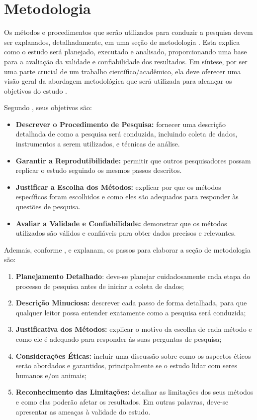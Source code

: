 \section{Metodologia}\label{sec:metodologia}

Os métodos e procedimentos que serão utilizados para conduzir a pesquisa devem ser explanados, detalhadamente, em uma seção de metodologia \cite{Wazlawick2021}. Esta explica como o estudo será planejado, executado e analisado, proporcionando uma base para a avaliação da validade e confiabilidade dos resultados. Em síntese, por ser uma parte crucial de um trabalho científico/acadêmico, ela deve oferecer uma visão geral da abordagem metodológica que será utilizada para alcançar os objetivos do estudo \cite{Marconi2021}.

Segundo , seus objetivos são:
\begin{itemize}[itemsep=0pt, leftmargin=2.3cm]
    \item \textbf{Descrever o Procedimento de Pesquisa:} fornecer uma descrição detalhada de como a pesquisa será conduzida, incluindo coleta de dados, instrumentos a serem utilizados, e técnicas de análise.
    \item \textbf{Garantir a Reprodutibilidade:} permitir que outros pesquisadores possam replicar o estudo seguindo os mesmos passos descritos.
    \item \textbf{Justificar a Escolha dos Métodos:} explicar por que os métodos específicos foram escolhidos e como eles são adequados para responder às questões de pesquisa.
    \item \textbf{Avaliar a Validade e Confiabilidade:} demonstrar que os métodos utilizados são válidos e confiáveis para obter dados precisos e relevantes.
\end{itemize}

Ademais, conforme , e  explanam, os passos para elaborar a seção de metodologia são:
\begin{enumerate}[label=\roman*., itemsep=0pt, leftmargin=2.3cm]
    \item \textbf{Planejamento Detalhado}: deve-se planejar cuidadosamente cada etapa do processo de pesquisa antes de iniciar a coleta de dados;
    \item \textbf{Descrição Minuciosa:} descrever cada passo de forma detalhada, para que qualquer leitor possa entender exatamente como a pesquisa será conduzida;
    \item \textbf{Justificativa dos Métodos:} explicar o motivo da escolha de cada método e como ele é adequado para responder às suas perguntas de pesquisa;
    \item \textbf{Considerações Éticas:} incluir uma discussão sobre como os aspectos éticos serão abordados e garantidos, principalmente se o estudo lidar com seres humanos e/ou animais;
    \item \textbf{Reconhecimento das Limitações:} detalhar as limitações dos seus métodos e como elas poderão afetar os resultados. Em outras palavras, deve-se apresentar as ameaças à validade do estudo.
\end{enumerate}

